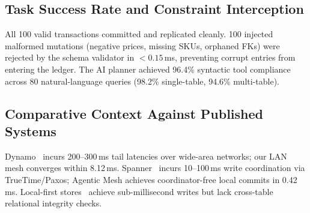 \begin{table}[!t]
\caption{Mesh Scalability: Measured Baselines ($N=2, 4$) and Analytical Projections ($N=10$--$100$) via Theorem~\ref{thm:convergence}.}
\label{tab:scalability-projection}
\centering
{}
\end{table}

\subsection{Task Success Rate and Constraint Interception}
\label{sec:eval-success}
All 100 valid transactions committed and replicated cleanly. 100 injected malformed mutations (negative prices, missing SKUs, orphaned FKs) were rejected by the schema validator in $<0.15$\,ms, preventing corrupt entries from entering the ledger. The AI planner achieved 96.4\% syntactic tool compliance across 80 natural-language queries (98.2\% single-table, 94.6\% multi-table).

\subsection{Comparative Context Against Published Systems}
\label{sec:eval-comparative}
Dynamo~\cite{decandia2007dynamo} incurs 200--300\,ms tail latencies over wide-area networks; our LAN mesh converges within 8.12\,ms. Spanner~\cite{corbett2013spanner} incurs 10--100\,ms write coordination via TrueTime/Paxos; Agentic Mesh achieves coordinator-free local commits in 0.42\,ms. Local-first stores~\cite{kleppmann2019local} achieve sub-millisecond writes but lack cross-table relational integrity checks.

